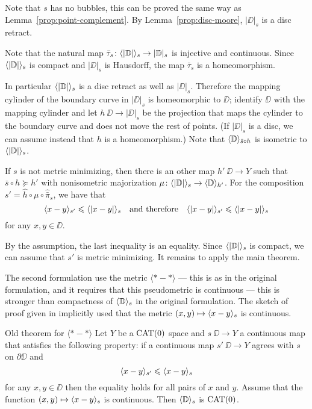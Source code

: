Note that $s$ has no bubbles, this can be proved the same way as Lemma~\ref{prop:point-complement}.
By Lemma~\ref{prop:disc-moore},  $|\DD|_s$ is a disc retract.

Note that the natural map $\bar\tau_s\colon\langle|\mathbb{D}|\rangle_s\to |\mathbb{D}|_s$ is injective and continuous.
Since $\langle|\mathbb{D}|\rangle_s$ is compact and $|\DD|_s$ is Hausdorff, the map $\bar\tau_s$ is a homeomorphism.

In particular $\langle|\mathbb{D}|\rangle_s$ is a disc retract as well as $|\DD|_s$.
Therefore the mapping cylinder of the boundary curve in $|\DD|_s$ is homeomorphic to $\DD$;
identify $\DD$ with the mapping cylinder and let $h\:\DD\to|\DD|_s$ be the projection that maps the cylinder to the boundary curve and does not move the rest of points.
(If $|\DD|_s$ is a disc, we can assume instead that $h$ is a homeomorphism.)
Note that $\langle\mathbb{D}\rangle_{\bar s\circ h}$ is isometric to $\langle|\mathbb{D}|\rangle_s$.

If $s$ is not metric minimizing,
then there is an other map $h'\:\DD\to Y$ such that $\bar s\circ h\succcurlyeq h'$ with nonisometric majorization $\mu\colon\langle|\mathbb{D}|\rangle_s\to \langle\mathbb{D}\rangle_{h'}$.
For the composition $s'=\hat h\circ \mu\circ  \hat{\bar \pi}_s$, we have that 
\[\langle x-y\rangle_{s'}\leqslant \langle|x-y|\rangle_{s}\quad\text{and therefore}\quad \langle|x-y|\rangle_{s'}\leqslant \langle|x-y|\rangle_{s}\]
for any $x,y\in\DD$.

By the assumption, the last inequality is an equality.
Since $\langle|\mathbb{D}|\rangle_s$ is compact, we can assume that $s'$ is metric minimizing. %
It remains to apply the main theorem.
\qeds

The second formulation use the metric $\langle{*}-{*}\rangle$ --- this is as in the original formulation,
and it requires that this pseudometric is continuous --- this is stronger than  
compactness of $\langle\mathbb{D}\rangle_s$ in the original formulation.
The sketch of proof given in \cite{petrunin-metric-min} implicitly used that the metric $(x,y)\zz\mapsto\<x-y\>_{s}$ is continuous.

\begin{thm}{Old theorem for $\bm{\langle{*}-{*}\rangle}$}\label{thm:old2}
Let $Y$ be a $\mathop{\rm CAT}\nolimits(0)$ space and $s\:\DD\to Y$ a continuous map that satisfies the following property: 
if a continuous map $s'\:\DD\to Y$ agrees with $s$ on $\partial\DD$ and
\[\langle x-y\rangle_{s'}\leqslant \langle x-y\rangle_{s}\]
for any $x,y\in \DD$
then the equality holds for all pairs of $x$ and $y$.
Assume that the function $(x,y)\mapsto\langle x-y\rangle_{s}$ is continuous.
Then $\langle\mathbb{D}\rangle_s$ is $\mathop{\rm CAT}\nolimits(0)$.
\end{thm}

